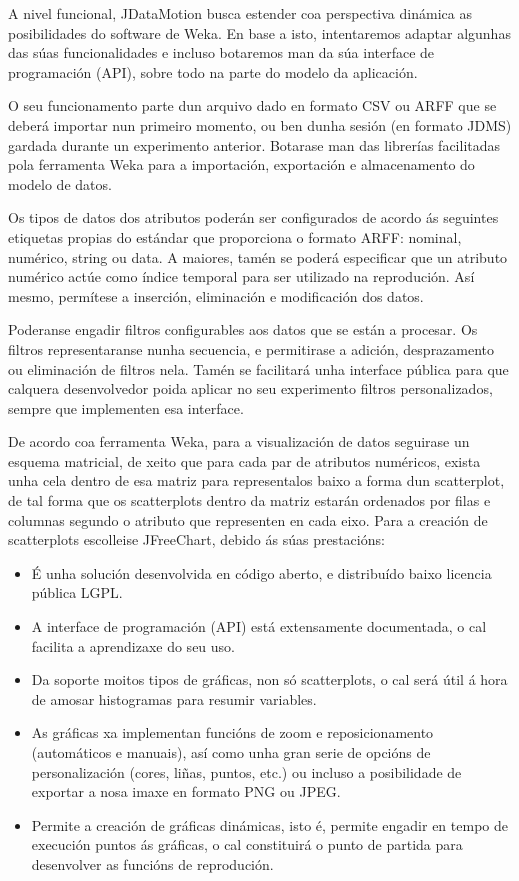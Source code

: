 A nivel funcional, JDataMotion busca estender coa perspectiva dinámica as posibilidades do software de Weka\cite{weka}. En base a isto, intentaremos adaptar algunhas das súas funcionalidades e incluso botaremos man da súa interface de programación (API), sobre todo na parte do modelo da aplicación.
 
O seu funcionamento parte dun arquivo dado en formato CSV ou ARFF que se deberá importar nun primeiro momento, ou ben dunha sesión (en formato JDMS) gardada durante un experimento anterior. Botarase man das librerías facilitadas pola ferramenta Weka\cite{weka} para a importación, exportación e almacenamento do modelo de datos. 

Os tipos de datos dos atributos poderán ser configurados de acordo ás seguintes etiquetas propias do estándar que proporciona o formato ARFF\cite{arff}: nominal, numérico, string ou data. A maiores, tamén se poderá especificar que un atributo numérico actúe como índice temporal para ser utilizado na reprodución. Así mesmo, permítese a inserción, eliminación e modificación dos datos.

Poderanse engadir filtros configurables aos datos que se están a procesar. Os filtros representaranse nunha secuencia, e permitirase a adición, desprazamento ou eliminación de filtros nela. Tamén se facilitará unha interface pública para que calquera desenvolvedor poida aplicar no seu experimento filtros personalizados, sempre que implementen esa interface.

De acordo coa ferramenta Weka\cite{weka}, para a visualización de datos seguirase un esquema matricial, de xeito que para cada par de atributos numéricos, exista unha cela dentro de esa matriz para representalos baixo a forma dun scatterplot, de tal forma que os scatterplots dentro da matriz estarán ordenados por filas e columnas segundo o atributo que representen en cada eixo. Para a creación de scatterplots escolleise JFreeChart\cite{jfreechart}, debido ás súas prestacións\cite{jfreechart}\cite{introduction_to_jfreechart}:

\begin{itemize}
\item É unha solución desenvolvida en código aberto, e distribuído baixo licencia pública LGPL.
\item A interface de programación (API) está extensamente documentada, o cal facilita a aprendizaxe do seu uso.
\item Da soporte moitos tipos de gráficas, non só scatterplots, o cal será útil á hora de amosar histogramas para resumir variables.
\item As gráficas xa implementan funcións de zoom e reposicionamento (automáticos e manuais), así como unha gran serie de opcións de personalización (cores, liñas, puntos, etc.) ou incluso a posibilidade de exportar a nosa imaxe en formato PNG ou JPEG.
\item Permite a creación de gráficas dinámicas, isto é, permite engadir en tempo de execución puntos ás gráficas, o cal constituirá o punto de partida para desenvolver as funcións de reprodución.
\end{itemize} 
 
